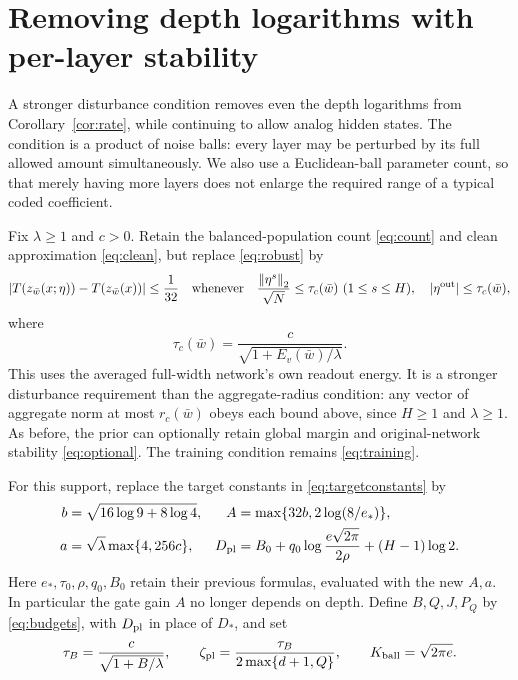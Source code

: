 \section{Removing depth logarithms with per-layer stability}
\label{sec:perlayer}

A stronger disturbance condition removes even the depth logarithms from
Corollary~\ref{cor:rate}, while continuing to allow analog hidden states.
The condition is a product of noise balls: every layer may be perturbed
by its full allowed amount simultaneously. We also use a Euclidean-ball
parameter count, so that merely having more layers does not enlarge the
required range of a typical coded coefficient.

Fix $\lambda\ge1$ and $c>0$. Retain the balanced-population count
\eqref{eq:count} and clean approximation \eqref{eq:clean}, but replace
\eqref{eq:robust} by
\begin{equation}\label{eq:perlayer-stability}
 |T(z_{\bar w}(x;\eta))-T(z_{\bar w}(x))|\le\frac1{32}
 \quad\text{whenever}\quad
 \frac{\left\|\eta^s\right\|_2}{\sqrt N}\le\tau_c(\bar w)\ (1\le s\le H),
 \quad |\eta^{\rm out}|\le\tau_c(\bar w),
\end{equation}
where
\[
 \tau_c(\bar w)=\frac{c}{\sqrt{1+E_v(\bar w)/\lambda}}.
\]
This uses the averaged full-width network's own readout energy. It is a
stronger disturbance requirement than the aggregate-radius condition:
any vector of aggregate norm at most $r_c(\bar w)$ obeys each bound above,
since $H\ge1$ and $\lambda\ge1$. As before, the prior can optionally
retain global margin and original-network stability \eqref{eq:optional}.
The training condition remains \eqref{eq:training}.

For this support, replace the target constants in
\eqref{eq:targetconstants} by
\begin{align}
 b&=\sqrt{16\log9+8\log4},&
 A&=\max\{32b,2\log(8/e_*)\},\notag\\
 a&=\sqrt\lambda\max\{4,256c\},&
 D_{\rm pl}&=B_0+q_0\log\frac{e\sqrt{2\pi}}{2\rho}+(H-1)\log2.
 \label{eq:perlayer-target}
\end{align}
Here $e_*,\tau_0,\rho,q_0,B_0$ retain their previous formulas, evaluated
with the new $A,a$. In particular the gate gain $A$ no longer depends on
depth. Define $B,Q,J,P_Q$ by \eqref{eq:budgets}, with $D_{\rm pl}$ in
place of $D_*$, and set
\begin{equation}\label{eq:perlayer-mesh}
 \tau_B=\frac c{\sqrt{1+B/\lambda}},\qquad
 \zeta_{\rm pl}=\frac{\tau_B}{2\max\{d+1,Q\}},\qquad
 K_{\rm ball}=\sqrt{2\pi e}.
\end{equation}

